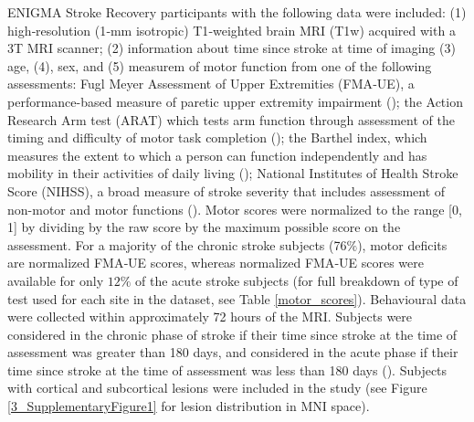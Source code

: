 \documentclass[phd,tocprelim]{cornell}
\begin{document}
ENIGMA Stroke Recovery participants with the following data were included: (1) high‐resolution (1‐mm isotropic) T1‐weighted brain MRI (T1w) acquired with a 3T MRI scanner; (2) information about time since stroke at time of imaging (3) age, (4), sex, and (5) measurem of motor function from one of the following assessments: Fugl Meyer Assessment of Upper Extremities (FMA‐UE), a performance-based measure of paretic upper extremity impairment (\cite{Gladstone2002-fw}); the Action Research Arm test (ARAT) which tests arm function through assessment of the timing and difficulty of motor task completion (\cite{Yozbatiran2008-xv}); the Barthel index, which measures the extent to which a person can function independently and has mobility in their activities of daily living (\cite{Sulter1999-rr}); National Institutes of Health Stroke Score (NIHSS), a broad measure of stroke severity that includes assessment of non-motor and motor functions (\cite{Lyden2017-za}). Motor scores were normalized to the range [0, 1] by dividing by the raw score by the maximum possible score on the assessment. For a majority of the chronic stroke subjects (76$\%$), motor deficits are normalized FMA‐UE scores, whereas  normalized FMA‐UE scores were available for only $12\%$ of the acute stroke subjects (for full breakdown of type of test used for each site in the dataset, see Table \ref{motor_scores}). Behavioural data were collected within approximately 72 hours of the MRI. Subjects were considered in the chronic phase of stroke if their time since stroke at the time of assessment was greater than 180 days, and considered in the acute phase if their time since stroke at the time of assessment was less than 180 days (\cite{Bernhardt2017-av}). Subjects with cortical and subcortical lesions were included in the study (see Figure \ref{3_SupplementaryFigure1} for lesion distribution in MNI space). 

\newpage
\end{document}
